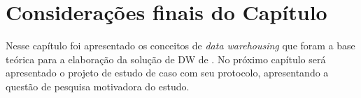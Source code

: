 \section{Considerações finais do Capítulo}

Nesse capítulo foi apresentado os conceitos de \textit{data warehousing} que foram a base teórica para a elaboração da solução de DW de . No próximo capítulo será apresentado o projeto de estudo de caso com seu protocolo, apresentando a questão de pesquisa motivadora do estudo.